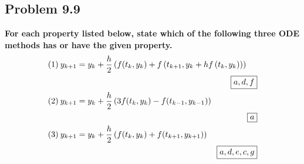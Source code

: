 \subsection{Problem 9.9}
\textbf{For each property listed below, state which of the following three ODE methods has or have the given property.}
\begin{align*}
(1)\:y_{k+1} &= y_k + \frac{h}{2}\left(f(t_k, y_k) + f\left(t_{k+1},y_k+hf\left(t_k, y_k\right)\right)\right)\\
& \Aboxed{a, d, f}\\
(2)\:y_{k+1} &= y_k + \frac{h}{2}\left(3f(t_k, y_k) - f(t_{k-1}, y_{k-1})\right)\\
& \Aboxed{a}\\
(3)\:y_{k+1} &= y_k + \frac{h}{2}\left(f(t_k, y_k) + f(t_{k+1}, y_{k+1})\right)\\
& \Aboxed{a, d, e, c, g}\\
\end{align*}